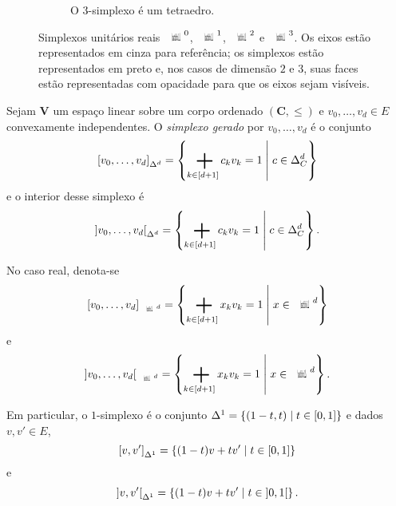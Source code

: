 \begin{figure}
\begin{subfigure}[b]{0.5\textwidth}
	\caption{O $3$-simplexo é um tetraedro.}
	\label{sfig:simplexos.tetraedro}
\end{subfigure}

\caption[Simplexos unitários reais de dimensões $0$, $1$, $2$ e $3$]{
	Simplexos unitários reais $\Sx^0$, $\Sx^1$, $\Sx^2$ e $\Sx^3$. Os eixos estão representados em cinza para referência; os simplexos estão representados em preto e, nos casos de dimensão $2$ e $3$, suas faces estão representadas com opacidade para que os eixos sejam visíveis.%
}
\label{fig:simplexos}
\end{figure}

\begin{definition}
Sejam $\bm V$ um espaço linear sobre um corpo ordenado $(\bm C,\leq)$ e $v_0, \ldots, v_d \in E$ convexamente independentes. O \emph{simplexo gerado} por $v_0, \ldots, v_d$ é o conjunto
	\begin{equation*}
	\simpger[d]{v_0, \ldots, v_d} = \set{\sum_{k \in [d+1]} c_k v_k = 1}{c \in \simp^d_C}
	\end{equation*}
e o interior desse simplexo é
	\begin{equation*}
	\simpgera[d]{v_0, \ldots, v_d} = \set{\sum_{k \in [d+1]} c_k v_k = 1}{c \in \simp^d_C}.
	\end{equation*}
\end{definition}

No caso real, denota-se
\begin{equation*}
	\Sxger[d]{v_0, \ldots, v_d} = \set{\sum_{k \in [d+1]} x_k v_k = 1}{x \in \Sx^d}
	\end{equation*}
e
	\begin{equation*}
	\Sxgera[d]{v_0, \ldots, v_d} = \set{\sum_{k \in [d+1]} x_k v_k = 1}{x \in \Sx^d}.
	\end{equation*}

Em particular, o $1$-simplexo é o conjunto $\Delta^1 = \left\{{(1-t,t)}\;\middle\vert\;{t \in \left[{0},{1}\right]}\right\}$ e dados $v,v' \in E$,
	\begin{equation*}
	\left[{v,v'}\right]_{\Delta^{1}} = \left\{{(1-t)v + tv'}\;\middle\vert\;{t \in \left[{0},{1}\right]}\right\}
	\end{equation*}
e
	\begin{equation*}
	\left]{v,v'}\right[_{\Delta^{1}} = \left\{{(1-t)v + tv'}\;\middle\vert\;{t \in \left]{0},{1}\right[}\right\}.
	\end{equation*}
















